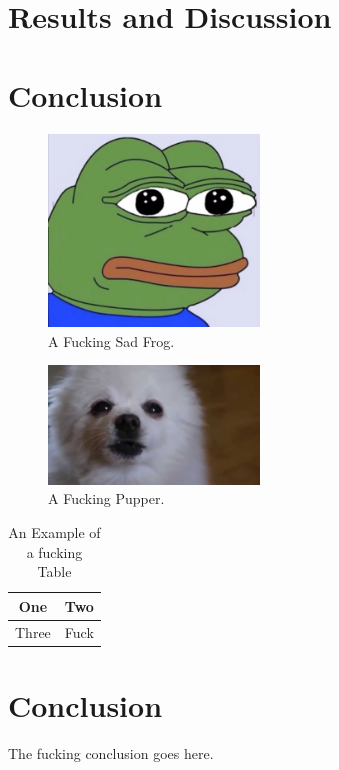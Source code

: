 \documentclass[journal,transmag]{IEEEtran}
\begin{document}
\section{Results and Discussion}
	\lipsum[6-8]
	
\section{Conclusion}
	\lipsum[9-10]
	
\begin{figure}[!t]
	\centering
	\includegraphics[width= 0.5\textwidth]{IMAGES/exampleImage}
	\caption{A Fucking Sad Frog.}
	\label{fig_frog}
\end{figure}

\begin{figure}[!t]
	\centering
	\includegraphics[width= 0.5\textwidth]{IMAGES/fig2}
	\caption{A Fucking Pupper.}
	\label{fig_pup}
\end{figure}

\begin{table}[!t]
	\renewcommand{\arraystretch}{1.3}
	\caption{An Example of a fucking Table}
	\label{table_example}
	\centering
	\begin{tabular}{|c|c|}
		\hline
		One & Two\\
		\hline
		Three & Fuck\\
		\hline
	\end{tabular}
\end{table}

\section{Conclusion}
The fucking conclusion goes here.
\end{document}
